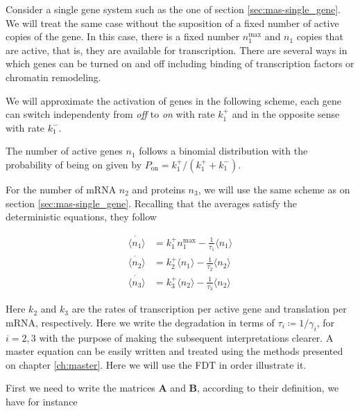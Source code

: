 Consider a single gene system such as the one of section \ref{sec:mas-single_gene}. We will treat the same case without the suposition of a fixed number of active copies of the gene. In this case, there is a fixed number $n_1^{\text{max}}$ and $n_1$ copies that are active, that is, they are available for transcription. There are several ways in which genes can be turned on and off including binding of transcription factors or chromatin remodeling.


We will approximate the activation of genes in the following scheme, each gene can switch independenty from \textit{off} to \textit{on} with rate $k_1^+$ and in the opposite sense with rate $k_1^-$.


The number of active genes $n_1$ follows a binomial distribution with the probability of being on given by $P_{\text{on}}=k_1^+/(k_1^++k_1^-)$.

For the number of mRNA $n_2$ and proteins $n_3$, we will use the same scheme as on section \ref{sec:mas-single_gene}. Recalling that the averages satisfy the deterministic equations, they follow


\begin{equation}
  \begin{split}
    \dot{\langle n_1\rangle} &= k_1^+n_1^\text{max} - \frac{1}{\tau_1}\langle n_1\rangle\\
    \dot{\langle n_2\rangle} &= k_2^+\langle n_1\rangle - \frac{1}{\tau_2}\langle n_2\rangle\\
    \dot{\langle n_3\rangle} &= k_3^+\langle n_2\rangle - \frac{1}{\tau_3}\langle n_2\rangle
  \end{split}
\end{equation}

Here $k_2$ and $k_3$ are the rates of transcription per active gene and translation per mRNA, respectively. Here we write the degradation in terms of $\tau_i\coloneqq 1/\gamma_i$, for $i=2,3$ with the purpose of making the subsequent interpretations clearer. A master equation can be easily written and treated using the methods presented on chapter \ref{ch:master}. Here we will use the FDT in order illustrate it.

First we need to write the matrices $\mathbf{A}$ and $\mathbf{B}$, according to their definition, we have for instance

